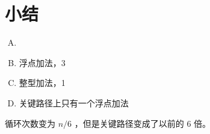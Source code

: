 
\section{小结}
{
    \begin{practicec}
        \begin{enumerate}[A.]
            \item {}
            \item 浮点加法，3
            \item 整型加法，1
            \item 关键路径上只有一个浮点加法
        \end{enumerate}
    \end{practicec}

    \begin{practicec}
        循环次数变为 $n / 6$ ，但是关键路径变成了以前的 $6$ 倍。
    \end{practicec}

    \begin{practicec}
    \end{practicec}

    \begin{practicec}

    \end{practicec}

    \begin{practicec}

    \end{practicec}

    \begin{practicec}

    \end{practicec}

    \begin{practicec}

    \end{practicec}
}
